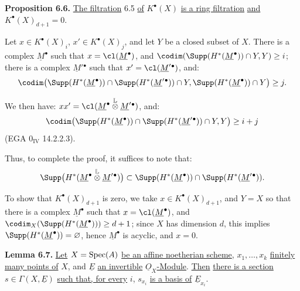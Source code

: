 \textbf{Proposition 6.6.} \uline{The filtration} 6.5 \uline{of} $K^{\bullet}(X)$ \uline{is a ring filtration} \uline{and} $K^{\bullet}(X)_{d+1}=0$.

Let $x\in K^{\bullet}(X)_i$, $x'\in K^{\bullet}(X)_j$, and let $Y$ be a closed subset of $X$. There is a complex $\underline{M}^\bullet$ such that $x=\cl(\underline{M}^\bullet)$, and $\codim(\Supp(H^*(\underline{M}^\bullet))\cap Y,Y)\ge i$; there is a complex $\underline{M}'{}^\bullet$ such that $x'=\cl(\underline{M}'{}^\bullet)$, and:
\[
\codim\bigl(\Supp(H^*(\underline{M}^\bullet))\cap\Supp(H^*(\underline{M}'{}^\bullet))\cap Y,
            \Supp(H^*(\underline{M}^\bullet))\cap Y\bigr)\ge j.
\]

We then have: $xx'=\cl(\underline{M}^\bullet\overset{\mathbb L}{\otimes}\underline{M}'{}^\bullet)$, and:
\[
\codim\bigl(\Supp(H^*(\underline{M}^\bullet))\cap\Supp(H^*(\underline{M}'{}^\bullet))\cap Y,Y\bigr)\ge i+j
\]
(EGA $0_{\mathrm{IV}}$ 14.2.2.3).

%
Thus, to complete the proof, it suffices to note that:
\[
\Supp\bigl(H^*(\underline{M}^\bullet\overset{\mathbb L}{\otimes}\underline{M}'{}^\bullet)\bigr)
 \subset \Supp(H^*(\underline{M}^\bullet))\cap\Supp(H^*(\underline{M}'{}^\bullet)).
\]

To show that $K^{\bullet}(X)_{d+1}$ is zero, we take $x\in K^{\bullet}(X)_{d+1}$, and $Y=X$ so that there is a complex $\underline{M}^\bullet$ such that $x=\cl(\underline{M}^\bullet)$, and $\codim_X(\Supp(H^*(\underline{M}^\bullet)))\ge d+1$; since $X$ has dimension $d$, this implies $\Supp(H^*(\underline{M}^\bullet))=\varnothing$, hence $\underline{M}^\bullet$ is acyclic, and $x=0$.

\textbf{Lemma 6.7.} \uline{Let} $X=\operatorname{Spec}(A)$ \uline{be an affine noetherian scheme}, $x_1,\ldots,x_k$ \uline{finitely many points of} $X$, and $\underline{E}$ \uline{an invertible} $\underline{O}_X$\uline{-Module}. \uline{Then} \uline{there is a section} $s\in\Gamma(X,\underline{E})$ \uline{such that, for every} $i$, $s_{x_i}$ \uline{is a basis of} $\underline{E}_{x_i}$.

